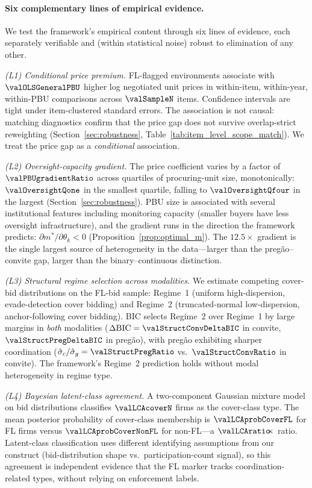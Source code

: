 \paragraph{Six complementary lines of empirical evidence.}
We test the framework's empirical content through six lines of
evidence, each separately verifiable and (within statistical noise)
robust to elimination of any other.

\emph{(L1) Conditional price premium.} FL-flagged environments
associate with $\valOLSGeneralPBU$ higher log negotiated unit prices in
within-item, within-year, within-PBU comparisons across $\valSampleN$
items. Confidence intervals are tight under item-clustered standard
errors. The association is not causal: matching diagnostics confirm
that the price gap does not survive overlap-strict reweighting
(Section~\ref{sec:robustness}, Table~\ref{tab:item_level_scope_match}).
We treat the price gap as a \emph{conditional} association.

\emph{(L2) Oversight-capacity gradient.} The price coefficient varies
by a factor of $\valPBUgradientRatio$ across quartiles of procuring-unit
size, monotonically: $\valOversightQone$ in the smallest quartile, falling
to $\valOversightQfour$ in the largest (Section~\ref{sec:robustness}).
PBU size is associated with several institutional features including monitoring capacity (smaller buyers have less
oversight infrastructure), and the gradient runs in the direction the
framework predicts: $\partial m^*/\partial \theta_k < 0$
(Proposition~\ref{prop:optimal_m}). The $12.5\!\!\times$ gradient is the
single largest source of heterogeneity in the data---larger than the
preg\~ao--convite gap, larger than the binary--continuous distinction.

\emph{(L3) Structural regime selection across modalities.} We
estimate competing cover-bid distributions on the FL-bid sample:
Regime~1 (uniform high-dispersion, evade-detection cover bidding) and
Regime~2 (truncated-normal low-dispersion, anchor-following cover
bidding). BIC selects Regime~2 over Regime~1 by large margins in
\emph{both} modalities ($\Delta\mathrm{BIC}=\valStructConvDeltaBIC$ in
convite, $\valStructPregDeltaBIC$ in pregão), with pregão exhibiting
sharper coordination ($\hat{\sigma}_c/\hat{\sigma}_g = \valStructPregRatio$
vs.\ $\valStructConvRatio$ in convite). The framework's Regime~2
prediction holds without modal heterogeneity in regime type.

\emph{(L4) Bayesian latent-class agreement.} A two-component
Gaussian mixture model on bid distributions classifies
$\valLCAcoverN$ firms as the cover-class type. The mean posterior
probability of cover-class membership is $\valLCAprobCoverFL$ for FL
firms versus $\valLCAprobCoverNonFL$ for non-FL---a $\valLCAratio\!\!\times$
ratio. Latent-class classification uses different identifying
assumptions from our construct (bid-distribution shape vs.\
participation-count signal), so this agreement is independent
evidence that the FL marker tracks coordination-related types,
without relying on enforcement labels.

